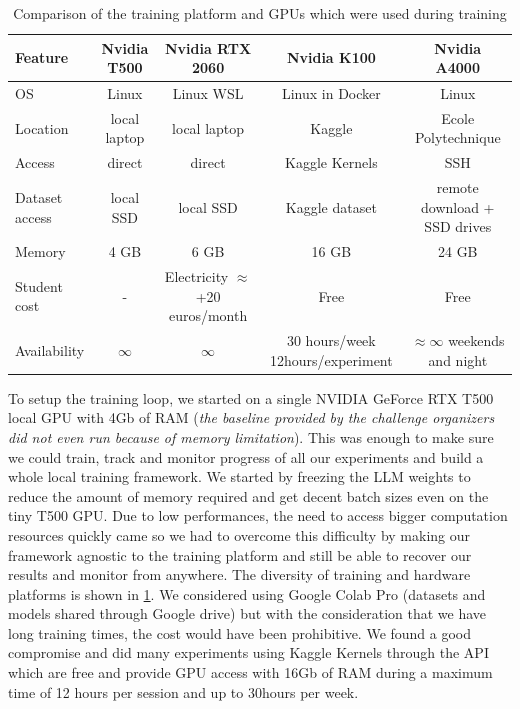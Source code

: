 \begin{table}[ht]
    \centering
    \begin{tabular}{lcccc}
    \hline
    \textbf{Feature} & \textbf{Nvidia T500} & \textbf{Nvidia RTX 2060} & \textbf{Nvidia K100} & \textbf{Nvidia A4000} \\ \hline
    OS & Linux & Linux WSL & Linux in Docker & Linux \\  
    Location            & local laptop           & local laptop  & Kaggle  & Ecole Polytechnique  \\
    Access & direct & direct & Kaggle Kernels & SSH \\
    Dataset access & local SSD & local SSD & Kaggle dataset & remote download + SSD drives\\ 
    Memory           & 4 GB                        & 6 GB                           & 16 GB                          & 24 GB                          \\
    Student cost & - & Electricity $\approx$ +20 euros/month & Free & Free \\
    Availability & $\infty$ & $\infty$ & 30 hours/week 12hours/experiment & $\approx \infty$ weekends and night \\
    \hline
    \end{tabular}
    \caption{Comparison of the training platform and GPUs which were used during training}
    \label{table:gpu_comparison}
\end{table}


To setup the training loop, we started on a single NVIDIA GeForce RTX T500 local GPU with 4Gb of RAM (\textit{the baseline provided by the challenge organizers did not even run because of memory limitation}). This was enough to make sure we could train, track and monitor progress of all our experiments and build a whole local training framework. We started by freezing the LLM weights to reduce the amount of memory required and get decent batch sizes even on the tiny T500 GPU. Due to low performances, the need to access bigger computation resources quickly came so we had to overcome this difficulty by making our framework agnostic to the training platform and still be able to recover our results and monitor from anywhere. The diversity of training and hardware platforms is shown in \ref*{table:gpu_comparison}. We considered using Google Colab Pro (datasets and models shared through Google drive) but with the consideration that we have long training times, the cost would have been prohibitive. We found a good compromise and did many experiments using Kaggle Kernels through the API which are free and provide GPU access with 16Gb of RAM during a maximum time of 12 hours per session and up to 30hours per week.